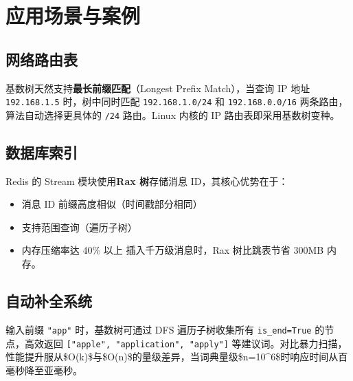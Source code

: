 \chapter{应用场景与案例}
\section{网络路由表}
基数树天然支持\textbf{最长前缀匹配}（Longest Prefix Match），当查询 IP 地址 \texttt{192.168.1.5} 时，树中同时匹配 \texttt{192.168.1.0/24} 和 \texttt{192.168.0.0/16} 两条路由，算法自动选择更具体的 \texttt{/24} 路由。Linux 内核的 IP 路由表即采用基数树变种。\par
\section{数据库索引}
Redis 的 Stream 模块使用\textbf{Rax 树}存储消息 ID，其核心优势在于：\par
\begin{itemize}
\item 消息 ID 前缀高度相似（时间戳部分相同）
\item 支持范围查询（遍历子树）
\item 内存压缩率达 40\%{} 以上
插入千万级消息时，Rax 树比跳表节省 300MB 内存。
\end{itemize}
\section{自动补全系统}
输入前缀 \texttt{"app"} 时，基数树可通过 DFS 遍历子树收集所有 \texttt{is\_{}end=True} 的节点，高效返回 \texttt{["apple", "application", "apply"]} 等建议词。对比暴力扫描，性能提升服从\${}O(k)\${}与\${}O(n)\${}的量级差异，当词典量级\${}n=10\^{}6\${}时响应时间从百毫秒降至亚毫秒。\par
